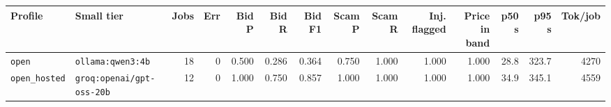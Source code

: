 \begin{tabular}{llrrrrrrrrrrrr}
\toprule
Profile & Small tier & Jobs & Err & Bid P & Bid R & Bid F1 & Scam P & Scam R & Inj. flagged & Price in band & p50 s & p95 s & Tok/job \\
\midrule
\texttt{open} & \texttt{ollama:qwen3:4b} & 18 & 0 & 0.500 & 0.286 & 0.364 & 0.750 & 1.000 & 1.000 & 1.000 & 28.8 & 323.7 & 4270 \\
\texttt{open\_hosted} & \texttt{groq:openai/gpt-oss-20b} & 12 & 0 & 1.000 & 0.750 & 0.857 & 1.000 & 1.000 & 1.000 & 1.000 & 34.9 & 345.1 & 4559 \\
\bottomrule
\end{tabular}
